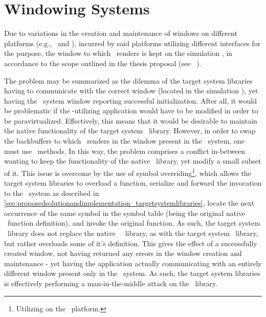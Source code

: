 \section{Windowing Systems}
\label{sec:proposedsolutionandimplementation_windowingsystems}
Due to variations in the creation and maintenance of windows on different platforms (e.g., \dvttermfedora\ and \dvttermandroid ), incurred by said platforms utilizing different interfaces for the purpose, the window to which \dvttermopengl\ renders is kept on the simulation \dvttermhost , in accordance to the scope outlined in the thesis proposal (see ~).

The problem may be summarized as the dilemma of the target system libraries having to communicate with the correct window (located in the simulation \dvttermhost ), yet having the \dvttermtarget\ system window reporting successful initialization.
After all, it would be problematic if the \dvttermopengl -utilizing application would have to be modified in order to be paravirtualized.
Effectively, this means that it would be desirable to maintain the native functionality of the target system \dvttermegl\ library.
However, in order to swap the backbuffers to which \dvttermopengl\ renders in the window present in the \dvttermhost\ system, one must use \dvttermegl\ methods.
In this way, the problem comprises a conflict in-between wanting to keep the functionality of the native \dvttermegl\ library, yet modify a small subset of it. 
This issue is overcome by the use of symbol overriding\footnote{Utilizing  on the \dvttermlinux\ platform.}, which allows the target system libraries to overload a function, serialize and forward the invocation to the \dvttermhost\ system as described in \ref{sec:proposedsolutionandimplementation_targetsystemlibraries}, locate the next occurrence of the same symbol in the symbol table (being the original native \dvttermegl\ function definition), and invoke the original function.
As such, the target system \dvttermegl\ library does not replace the native \dvttermtarget\ \dvttermegl\ library, as with the target system \dvttermopengl\ library, but rather overloads some of it's definition.
This gives the effect of a successfully created window, not having returned any errors in the window creation and maintenance - yet having the application actually communicating with an entirely different window present only in the \dvttermhost\ system.
As such, the target system libraries is effectively performing a man-in-the-middle attack on the \dvttermegl\ library.

